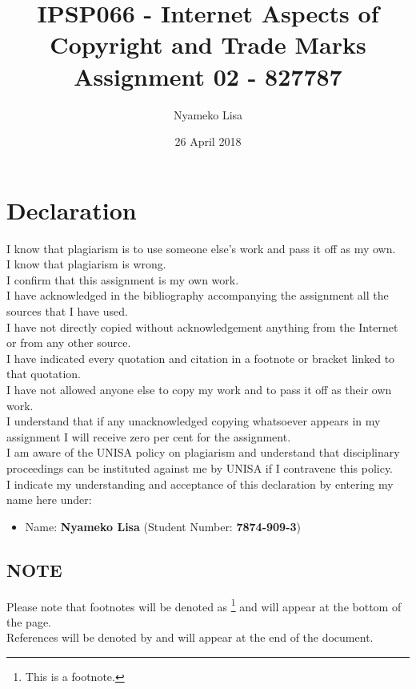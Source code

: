 \documentclass[11pt]{article}
\author{Nyameko Lisa}
\date{26 April 2018}
\title{IPSP066 - Internet Aspects of Copyright and Trade Marks\\\medskip
\large Assignment 02 - 827787}
\begin{document}
\maketitle
\addvspace{110pt}

\justifying
\addvspace{110pt}
\section*{Declaration}
\label{sec:orgd5c0d99}
I know that plagiarism is to use someone else’s work and pass it off as my own.\\
I know that plagiarism is wrong.\\
I confirm that this assignment is my own work.\\
I have acknowledged in the bibliography accompanying the assignment all the sources that I have used.\\
I have not directly copied without acknowledgement anything from the Internet or from any other source.\\
I have indicated every quotation and citation in a footnote or bracket linked to that quotation.\\
I have not allowed anyone else to copy my work and to pass it off as their own work.\\
I understand that if any unacknowledged copying whatsoever appears in my assignment I will receive zero per cent for the assignment.\\
I am aware of the UNISA policy on plagiarism and understand that disciplinary proceedings can be instituted against me by UNISA if I contravene this policy.\\
I indicate my understanding and acceptance of this declaration by
entering my name here under:
\begin{itemize}
\item Name: \textbf{Nyameko Lisa} (Student Number: \textbf{7874-909-3})
\end{itemize}

\subsection*{NOTE}
\label{sec:org5a720fe}
Please note that footnotes will be denoted as \footnote{This is a footnote.} and will
appear at the bottom of the page.\\
References will be denoted by \cite{rsa78_copyrightact} and will appear at the end of the document.
\newpage
\end{document}
